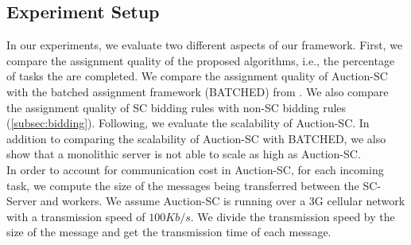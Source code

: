 

\subsection{Experiment Setup}
\label{subsec:exp_setup}

In our experiments, we evaluate two different aspects of our framework. First, we compare the assignment quality of the proposed algorithms, i.e., the percentage of tasks the are completed. We compare the assignment quality of Auction-SC with the batched assignment framework (BATCHED) from \cite{Deng15}. We also compare the assignment quality of SC bidding rules with non-SC bidding rules (\cref{subsec:bidding}). Following, we evaluate the scalability of Auction-SC. In addition to comparing the scalability of Auction-SC with BATCHED, we also show that a monolithic server is not able to scale as high as Auction-SC.\\

In order to account for communication cost in Auction-SC, for each incoming task, we compute the size of the messages being transferred between the SC-Server and workers. We assume Auction-SC is running over a 3G cellular network with a transmission speed of $100 Kb/s$. We divide the transmission speed by the size of the message and get the transmission time of each message.\\


